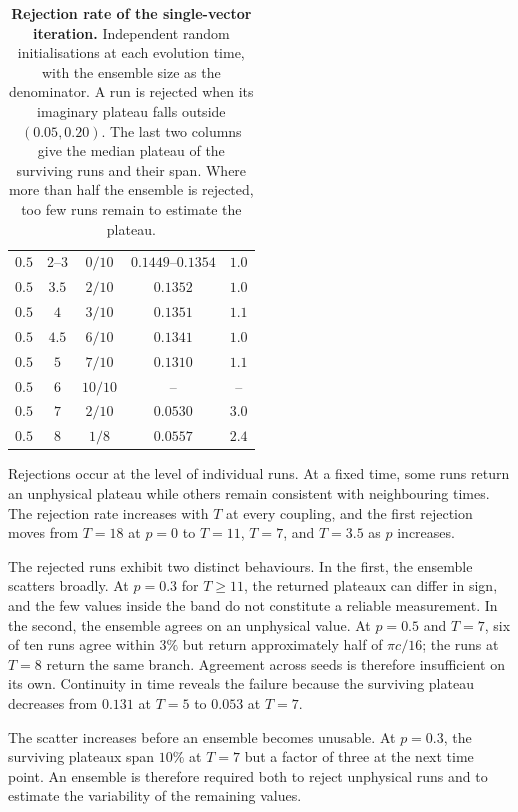 \begin{table}[!htb]
\begin{tabular}{lcccc}
    $0.5$ & $2$--$3$  & $0/10$   & $0.1449$--$0.1354$        & $1.0$        \\
    $0.5$ & $3.5$     & $2/10$   & $0.1352$                  & $1.0$        \\
    $0.5$ & $4$       & $3/10$   & $0.1351$                  & $1.1$        \\
    $0.5$ & $4.5$     & $6/10$   & $0.1341$                  & $1.0$        \\
    $0.5$ & $5$       & $7/10$   & $0.1310$                  & $1.1$        \\
    $0.5$ & $6$       & $10/10$  & --                        & --           \\
    $0.5$ & $7$       & $2/10$   & $0.0530$                  & $3.0$        \\
    $0.5$ & $8$       & $1/8$    & $0.0557$                  & $2.4$        \\
    \hline
  \end{tabular}
  \caption{\textbf{Rejection rate of the single-vector iteration.} Independent random initialisations at each evolution time, with the ensemble size as the denominator. A run is rejected when its imaginary plateau falls outside $(0.05,0.20)$. The last two columns give the median plateau of the surviving runs and their span. Where more than half the ensemble is rejected, too few runs remain to estimate the plateau.}
  \label{tab:failrate}
\end{table}

Rejections occur at the level of individual runs. At a fixed time, some runs return an unphysical plateau while others remain consistent with neighbouring times. The rejection rate increases with $T$ at every coupling, and the first rejection moves from $T=18$ at $p=0$ to $T=11$, $T=7$, and $T=3.5$ as $p$ increases.

The rejected runs exhibit two distinct behaviours. In the first, the ensemble scatters broadly. At $p=0.3$ for $T\ge11$, the returned plateaux can differ in sign, and the few values inside the band do not constitute a reliable measurement. In the second, the ensemble agrees on an unphysical value. At $p=0.5$ and $T=7$, six of ten runs agree within $3\%$ but return approximately half of $\pi c/16$; the runs at $T=8$ return the same branch. Agreement across seeds is therefore insufficient on its own. Continuity in time reveals the failure because the surviving plateau decreases from $0.131$ at $T=5$ to $0.053$ at $T=7$.

The scatter increases before an ensemble becomes unusable. At $p=0.3$, the surviving plateaux span $10\%$ at $T=7$ but a factor of three at the next time point. An ensemble is therefore required both to reject unphysical runs and to estimate the variability of the remaining values.

